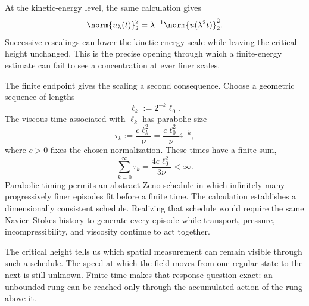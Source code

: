 At the kinetic-energy level, the same calculation gives
\[
  \norm{u_\lambda(t)}_2^2
  =
  \lambda^{-1}
  \norm{u(\lambda^2t)}_2^2.
\]
Successive rescalings can lower the kinetic-energy scale while leaving the critical height unchanged.
This is the precise opening through which a finite-energy estimate can fail to see a concentration at ever finer scales.

The finite endpoint gives the scaling a second consequence.
Choose a geometric sequence of lengths
\[
  \ell_k
  :=
  2^{-k}\ell_0.
\]
The viscous time associated with \(\ell_k\) has parabolic size
\[
  \tau_k
  :=
  \frac{c\ell_k^2}{\nu}
  =
  \frac{c\ell_0^2}{\nu}4^{-k},
\]
where \(c>0\) fixes the chosen normalization.
These times have a finite sum,
\[
  \sum_{k=0}^{\infty}\tau_k
  =
  \frac{4c\ell_0^2}{3\nu}
  <
  \infty.
\]
Parabolic timing permits an abstract Zeno schedule in which infinitely many progressively finer episodes fit before a finite time.
The calculation establishes a dimensionally consistent schedule.
Realizing that schedule would require the same Navier--Stokes history to generate every episode while transport, pressure, incompressibility, and viscosity continue to act together.

The critical height tells us which spatial measurement can remain visible through such a schedule.
The speed at which the field moves from one regular state to the next is still unknown.
Finite time makes that response question exact: an unbounded rung can be reached only through the accumulated action of the rung above it.
